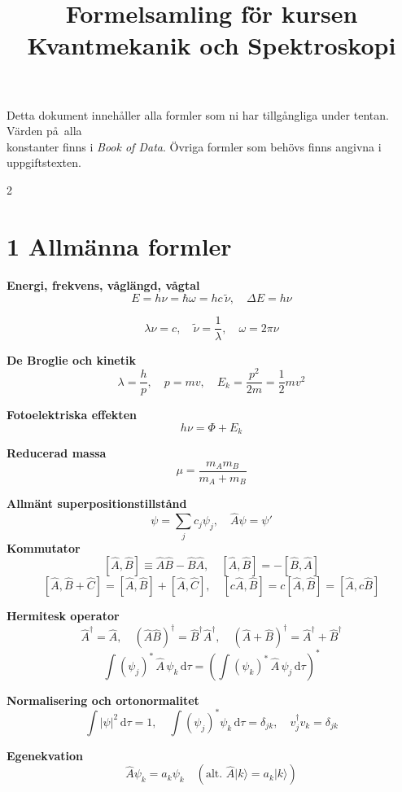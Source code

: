 \documentclass[10pt,a4paper]{article}
\title{Formelsamling f\"or kursen Kvantmekanik och Spektroskopi}
\author{}
\date{}
\newcommand{\dd}{\mathrm{d}}
\begin{document}
\maketitle
\begin{center}
Detta dokument inneh\aa ller alla formler som ni har tillg\aa ngliga under tentan.
V\"arden p\aa\ alla \\konstanter finns i \emph{Book of Data}. \"Ovriga formler som beh\"ovs
finns angivna i uppgiftstexten.
\end{center}
\vspace{0.3cm}

\begin{multicols*}{2}
\raggedcolumns
\scriptsize

\section*{1 Allmänna formler}

\textbf{Energi, frekvens, v\aa gl\"angd, v\aa gtal}
\[
E = h\nu = \hbar\omega = hc\,\tilde{\nu},\quad \Delta E = h\nu\]

\[
\lambda\nu = c,\quad \tilde{\nu}=\frac{1}{\lambda},\quad \omega=2\pi\nu
\]

\textbf{De Broglie och kinetik}
\[
\lambda = \frac{h}{p},\quad p=mv,\quad E_k=\frac{p^2}{2m}=\frac12 mv^2
\]

\textbf{Fotoelektriska effekten}
\[
 h\nu=\Phi+E_k
\]

\textbf{Reducerad massa}
\[
\mu=\frac{m_A m_B}{m_A+m_B}
\]

\textbf{Allmänt superpositionstillstånd}
\[
\psi=\sum_j c_j\psi_j,\quad \hat A\psi=\psi'
\]
\textbf{Kommutator}
\[
[\hat A,\hat B]\equiv \hat A\hat B-\hat B\hat A,\quad [\hat A,\hat B]=-[\hat B,\hat A]
\]
\[
[\hat A,\hat B+\hat C]=[\hat A,\hat B]+[\hat A,\hat C],\quad [c\hat A,\hat B]=c[\hat A,\hat B]=[\hat A,c\hat B]
\]

\textbf{Hermitesk operator}
\[
\hat A^\dagger=\hat A,\quad (\hat A\hat B)^\dagger=\hat B^\dagger\hat A^\dagger,\quad (\hat A+\hat B)^\dagger=\hat A^\dagger+\hat B^\dagger
\]
\[
\int (\psi_j)^*\,\hat A\,\psi_k\,\dd\tau=\left(\int (\psi_k)^*\,\hat A\,\psi_j\,\dd\tau\right)^*
\]

\textbf{Normalisering och ortonormalitet}
\[
\int\!|\psi|^2\,\dd\tau=1,\quad \int\!(\psi_j)^*\psi_k\,\dd\tau=\delta_{jk},\quad v_j^\dagger v_k=\delta_{jk}
\]

\textbf{Egenekvation}
\[ \hat A\psi_k=a_k\psi_k\quad(\text{alt. }
\hat A\lvert k\rangle=a_k\lvert k\rangle)
\]


\end{multicols*}
\end{document}
